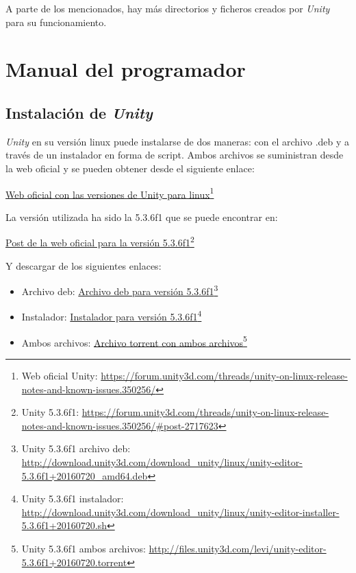 A parte de los mencionados, hay más directorios y ficheros creados por \textit{Unity} para su funcionamiento.

\section{Manual del programador}
\subsection{Instalación de \textit{Unity}}

\textit{Unity} \cite{unityweb} en su versión linux puede instalarse de dos maneras: con el archivo .deb y a través de un instalador en forma de script. Ambos archivos se suministran desde la web oficial y se pueden obtener desde el siguiente enlace:

\href{https://forum.unity3d.com/threads/unity-on-linux-release-notes-and-known-issues.350256/}{Web oficial con las versiones de Unity para linux}\footnote{Web oficial Unity: \url{https://forum.unity3d.com/threads/unity-on-linux-release-notes-and-known-issues.350256/}}

La versión utilizada ha sido la 5.3.6f1 que se puede encontrar en:

\href{https://forum.unity3d.com/threads/unity-on-linux-release-notes-and-known-issues.350256/#post-2717623}{Post de la web oficial para la versión 5.3.6f1}\footnote{Unity 5.3.6f1: \url{https://forum.unity3d.com/threads/unity-on-linux-release-notes-and-known-issues.350256/\#post-2717623}}

Y descargar de los siguientes enlaces:

\begin{itemize}
\item Archivo deb: \href{http://download.unity3d.com/download_unity/linux/unity-editor-5.3.6f1+20160720_amd64.deb}{Archivo deb para versión 5.3.6f1}\footnote{Unity 5.3.6f1 archivo deb: \url{http://download.unity3d.com/download_unity/linux/unity-editor-5.3.6f1+20160720_amd64.deb}}

\item Instalador: \href{http://download.unity3d.com/download_unity/linux/unity-editor-installer-5.3.6f1+20160720.sh}{Instalador para versión 5.3.6f1}\footnote{Unity 5.3.6f1 instalador: \url{http://download.unity3d.com/download_unity/linux/unity-editor-installer-5.3.6f1+20160720.sh}}

\item Ambos archivos: \href{http://files.unity3d.com/levi/unity-editor-5.3.6f1+20160720.torrent}{Archivo torrent con ambos archivos}\footnote{Unity 5.3.6f1 ambos archivos: \url{http://files.unity3d.com/levi/unity-editor-5.3.6f1+20160720.torrent}}
\end{itemize}

